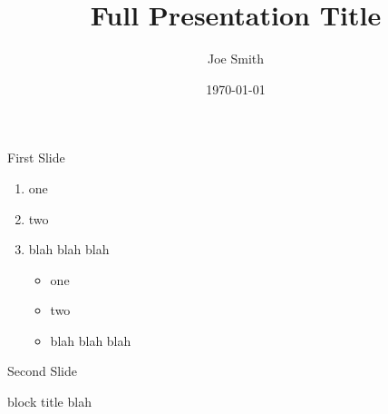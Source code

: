 \documentclass{beamer}
\title[Short Talk Title]{Full Presentation Title}
\author[J. Smith]{Joe Smith}
\date[2015]{\today}
\begin{document}
\begin{frame}
\titlepage
\end{frame}


\begin{frame}{First Slide}

\begin{enumerate}
\item one
\item two
\item blah blah blah

\begin{itemize}
\item one
\item two
\item blah blah blah

\end{itemize}

\end{enumerate}

\end{frame}





\begin{frame}{Second Slide}
\begin{block}{block title}
blah
\end{block}
\end{frame}
\end{document}
